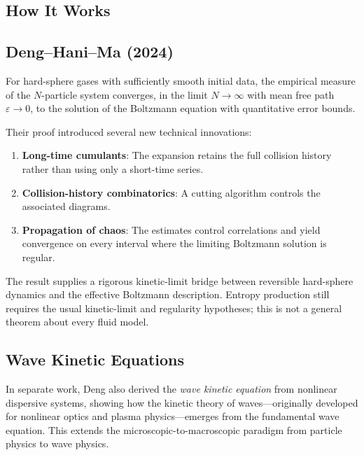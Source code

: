 \subsection{How It Works}

\subsection{Deng--Hani--Ma (2024)}

\begin{theorem}
For hard-sphere gases with sufficiently smooth initial data, the empirical measure of the $N$-particle system converges, in the limit $N \to \infty$ with mean free path $\varepsilon \to 0$, to the solution of the Boltzmann equation with quantitative error bounds.
\end{theorem}

Their proof introduced several new technical innovations:

\begin{enumerate}
\item \textbf{Long-time cumulants}: The expansion retains the full collision history rather than using only a short-time series.
\item \textbf{Collision-history combinatorics}: A cutting algorithm controls the associated diagrams.
\item \textbf{Propagation of chaos}: The estimates control correlations and yield convergence on every interval where the limiting Boltzmann solution is regular.
\end{enumerate}

\begin{highlightbox}
The result supplies a rigorous kinetic-limit bridge between reversible hard-sphere dynamics and the effective Boltzmann description. Entropy production still requires the usual kinetic-limit and regularity hypotheses; this is not a general theorem about every fluid model.
\end{highlightbox}

\subsection{Wave Kinetic Equations}

In separate work, Deng also derived the \emph{wave kinetic equation} from nonlinear dispersive systems, showing how the kinetic theory of waves---originally developed for nonlinear optics and plasma physics---emerges from the fundamental wave equation. This extends the microscopic-to-macroscopic paradigm from particle physics to wave physics.

